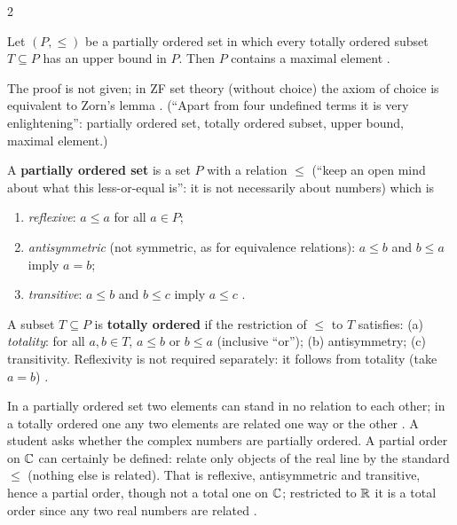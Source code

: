 \begin{paracol}{2}
\begin{theorem}\label{thm:rm-zorn}
Let $(P,\le)$ be a partially ordered set in which every totally ordered subset $T\subseteq P$ has an upper bound in $P$. Then $P$ contains a maximal element    .
\end{theorem}
The proof is not given; in ZF set theory (without choice) the axiom of choice is equivalent to Zorn's lemma  .
(``Apart from four undefined terms it is very enlightening'': partially ordered set, totally ordered subset, upper bound, maximal element.)

\begin{definition}\label{def:rm-poset}
A \textbf{partially ordered set} is a set $P$ with a relation $\le$ (``keep an open mind about what this less-or-equal is'': it is not necessarily about numbers) which is
\begin{enumerate}
  \item \emph{reflexive}: $a\le a$ for all $a\in P$;
  \item \emph{antisymmetric} (not symmetric, as for equivalence relations): $a\le b$ and $b\le a$ imply $a=b$;
  \item \emph{transitive}: $a\le b$ and $b\le c$ imply $a\le c$     .
\end{enumerate}
\end{definition}
\begin{definition}\label{def:rm-total}
A subset $T\subseteq P$ is \textbf{totally ordered} if the restriction of $\le$ to $T$ satisfies: (a) \emph{totality}: for all $a,b\in T$, $a\le b$ or $b\le a$ (inclusive ``or''); (b) antisymmetry; (c) transitivity. Reflexivity is not required separately: it follows from totality
(take $a=b$)      .
\end{definition}
In a partially ordered set two elements can stand in no relation to each other; in a totally ordered one any two elements are related one way or the other  . A student asks whether the complex numbers are partially ordered. A partial order on $\mathbb{C}$ can certainly be defined: relate only objects of the real line by the standard $\le$ (nothing else is related). That is reflexive,
antisymmetric and transitive, hence a partial order, though not a total one on $\mathbb{C}$; restricted to $\mathbb{R}$ it is a total order since any two real numbers are related     .


\end{paracol}

